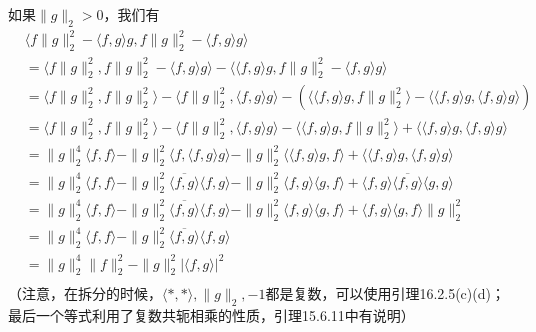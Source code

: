 \documentclass{article}
\begin{document}
\begin{itemize}
        如果$\|g\|_2 > 0$，我们有
        \begin{align*}
           & \langle f\|g\|_2^2 - \langle f, g \rangle g, f\|g\|_2^2 - \langle f, g \rangle g \rangle                                      \\
           & = \langle  f\|g\|_2^2, f\|g\|_2^2 - \langle f, g \rangle g \rangle
          - \langle \langle f, g \rangle g, f\|g\|_2^2 - \langle f, g \rangle g \rangle                                                    \\
           & = \langle  f\|g\|_2^2, f\|g\|_2^2 \rangle - \langle  f\|g\|_2^2, \langle f, g \rangle g \rangle
          - (\langle \langle f, g \rangle g, f\|g\|_2^2 \rangle - \langle \langle f, g \rangle g, \langle f, g \rangle g \rangle)          \\
           & = \langle  f\|g\|_2^2, f\|g\|_2^2 \rangle - \langle  f\|g\|_2^2, \langle f, g \rangle g \rangle
          - \langle \langle f, g \rangle g, f\|g\|_2^2 \rangle + \langle \langle f, g \rangle g, \langle f, g \rangle g \rangle            \\
           & = \|g\|_2^4 \langle  f, f \rangle - \|g\|_2^2 \langle  f, \langle f, g \rangle g \rangle
          - \|g\|_2^2 \langle \langle f, g \rangle g, f \rangle + \langle \langle f, g \rangle g, \langle f, g \rangle g \rangle           \\
           & = \|g\|_2^4 \langle  f, f \rangle - \|g\|_2^2 \overline{\langle f, g \rangle}\langle  f, g \rangle
          - \|g\|_2^2 \langle f, g \rangle\langle g, f \rangle + \langle f, g \rangle \overline{\langle f, g \rangle} \langle g, g \rangle \\
           & = \|g\|_2^4 \langle  f, f \rangle - \|g\|_2^2 \overline{\langle f, g \rangle}\langle  f, g \rangle
          - \|g\|_2^2 \langle f, g \rangle\langle g, f \rangle + \langle f, g \rangle \langle g, f \rangle \|g\|_2^2                       \\
           & = \|g\|_2^4 \langle  f, f \rangle - \|g\|_2^2 \overline{\langle f, g \rangle}\langle  f, g \rangle                            \\
           & = \|g\|_2^4\|f\|_2^2 - \|g\|_2^2|\langle  f, g \rangle|^2                                                                     \\
        \end{align*}
        （注意，在拆分的时候，$\langle *, * \rangle, \|g\|_2, -1$都是复数，可以使用引理16.2.5(c)(d)；
        最后一个等式利用了复数共轭相乘的性质，引理15.6.11中有说明）


\end{itemize}
\end{document}
